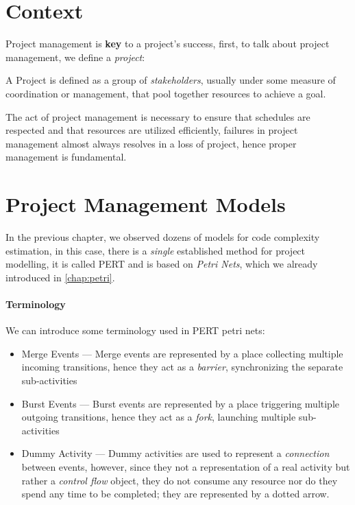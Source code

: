 \documentclass[openright, twoside, twocolumn, a4paper, 10pt]{report}
\begin{document}
\section{Context}

Project management is \textbf{key} to a project's success, first, to talk
about project management, we define a \emph{project}:

\begin{definition}[Project]
	A Project is defined as a group of \emph{stakeholders}, usually
	under some measure of coordination or management, that pool
	together resources to achieve a goal.
\end{definition}

The act of project management is necessary to ensure that schedules are respected
and that resources are utilized efficiently, failures in project management
almost always resolves in a loss of project, hence proper management is fundamental.

\section{Project Management Models}

In the previous chapter, we observed dozens of models for code complexity
estimation, in this case, there is a \emph{single} established method
for project modelling, it is called PERT and is based on \emph{Petri Nets},
which we already introduced in \cref{chap:petri}.

\paragraph{Terminology}
We can introduce some terminology used in PERT petri nets:

\begin{itemize}
	\item Merge Events --- Merge events are represented by a place collecting multiple
	      incoming transitions, hence they act as a \emph{barrier}, synchronizing the separate sub-activities
	\item Burst Events --- Burst events are represented by a place triggering multiple outgoing
	      transitions, hence they act as a \emph{fork}, launching multiple sub-activities
	\item Dummy Activity --- Dummy activities are used to represent a \emph{connection} between events,
	      however, since they not a representation of a real activity but rather a \emph{control flow} object, they
	      do not consume any resource nor do they spend any time to be completed; they are represented by a dotted arrow.
\end{itemize}
\end{document}
